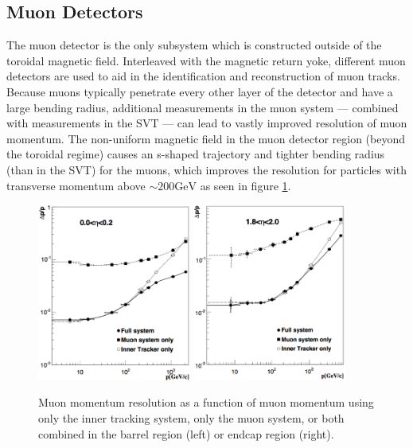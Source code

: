 \subsection{Muon Detectors}
\label{subsec:muondetector}
The muon detector is the only subsystem which is constructed outside of the toroidal magnetic field. Interleaved with the magnetic return yoke, different muon detectors are used to aid in the identification and reconstruction of muon tracks. Because muons typically penetrate every other layer of the detector and have a large bending radius, additional measurements in the muon system --- combined with measurements in the SVT --- can lead to vastly improved resolution of muon momentum. The non-uniform magnetic field in the muon detector region (beyond the toroidal regime) causes an s-shaped trajectory and tighter bending radius (than in the SVT) for the muons, which improves the resolution for particles with transverse momentum above $\sim200\text{GeV}$ as seen in figure \ref{fig:muonSigma}.
 \begin{figure}
	\centering
	\includegraphics[width=0.45\textwidth]{detector/figs/muonResInner}
	\includegraphics[width=0.45\textwidth]{detector/figs/muonResOuter}
	\caption{Muon momentum resolution as a function of muon momentum using only the inner tracking system, only the muon system, or both combined in the barrel region (left) or endcap region (right).}
	\label{fig:muonSigma}
\end{figure}

